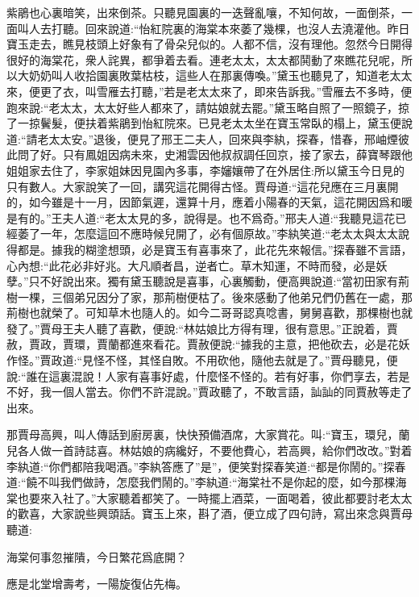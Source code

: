 \begin{parag}
    紫鵑也心裏暗笑，出來倒茶。只聽見園裏的一迭聲亂嚷，不知何故，一面倒茶，一面叫人去打聽。回來說道:“怡紅院裏的海棠本來萎了幾棵，也沒人去澆灌他。昨日寶玉走去，瞧見枝頭上好象有了骨朵兒似的。人都不信，沒有理他。忽然今日開得很好的海棠花，衆人詫異，都爭着去看。連老太太，太太都鬨動了來瞧花兒呢，所以大奶奶叫人收拾園裏敗葉枯枝，這些人在那裏傳喚。”黛玉也聽見了，知道老太太來，便更了衣，叫雪雁去打聽，”若是老太太來了，即來告訴我。”雪雁去不多時，便跑來說:“老太太，太太好些人都來了，請姑娘就去罷。”黛玉略自照了一照鏡子，掠了一掠鬢髮，便扶着紫鵑到怡紅院來。已見老太太坐在寶玉常臥的榻上，黛玉便說道:“請老太太安。”退後，便見了邢王二夫人，回來與李紈，探春，惜春，邢岫煙彼此問了好。只有鳳姐因病未來，史湘雲因他叔叔調任回京，接了家去，薛寶琴跟他姐姐家去住了，李家姐妹因見園內多事，李嬸孃帶了在外居住:所以黛玉今日見的只有數人。大家說笑了一回，講究這花開得古怪。賈母道:“這花兒應在三月裏開的，如今雖是十一月，因節氣遲，還算十月，應着小陽春的天氣，這花開因爲和暖是有的。”王夫人道:“老太太見的多，說得是。也不爲奇。”邢夫人道:“我聽見這花已經萎了一年，怎麼這回不應時候兒開了，必有個原故。”李紈笑道:“老太太與太太說得都是。據我的糊塗想頭，必是寶玉有喜事來了，此花先來報信。”探春雖不言語，心內想:“此花必非好兆。大凡順者昌，逆者亡。草木知運，不時而發，必是妖孽。”只不好說出來。獨有黛玉聽說是喜事，心裏觸動，便高興說道:“當初田家有荊樹一棵，三個弟兄因分了家，那荊樹便枯了。後來感動了他弟兄們仍舊在一處，那荊樹也就榮了。可知草木也隨人的。如今二哥哥認真唸書，舅舅喜歡，那棵樹也就發了。”賈母王夫人聽了喜歡，便說:“林姑娘比方得有理，很有意思。”正說着，賈赦，賈政，賈環，賈蘭都進來看花。賈赦便說:“據我的主意，把他砍去，必是花妖作怪。”賈政道:“見怪不怪，其怪自敗。不用砍他，隨他去就是了。”賈母聽見，便說:“誰在這裏混說！人家有喜事好處，什麼怪不怪的。若有好事，你們享去，若是不好，我一個人當去。你們不許混說。”賈政聽了，不敢言語，訕訕的同賈赦等走了出來。
\end{parag}


\begin{parag}
    那賈母高興，叫人傳話到廚房裏，快快預備酒席，大家賞花。叫:“寶玉，環兒，蘭兒各人做一首詩誌喜。林姑娘的病纔好，不要他費心，若高興，給你們改改。”對着李紈道:“你們都陪我喝酒。”李紈答應了”是”，便笑對探春笑道:“都是你鬧的。”探春道:“饒不叫我們做詩，怎麼我們鬧的。”李紈道:“海棠社不是你起的麼，如今那棵海棠也要來入社了。”大家聽着都笑了。一時擺上酒菜，一面喝着，彼此都要討老太太的歡喜，大家說些興頭話。寶玉上來，斟了酒，便立成了四句詩，寫出來念與賈母聽道:
\end{parag}


\begin{poem}
    \begin{pl}
        海棠何事忽摧隤，今日繁花爲底開？
    \end{pl}


    \begin{pl}
        應是北堂增壽考，一陽旋復佔先梅。
    \end{pl}

\end{poem}


